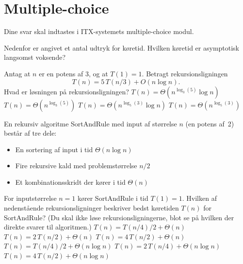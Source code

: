 \section*{Multiple-choice}\label{sec:mc}

Dine svar skal indtastes i ITX-systemets multiple-choice modul.

\multiplechoicestart


Nedenfor er angivet et antal udtryk for køretid. Hvilken køretid er asymptotisk langsomst voksende?
\etsvar
\mulighederstart
{}
\korrekt
\mulighederslut
{}


Antag at $n$ er en potens af $3$, og at $T(1)=1$. Betragt rekursionsligningen
\[
T(n) = 5\, T(n/3) + O(n \log n).
\]
Hvad er løsningen på rekursionsligningen?
\etsvar
\mulighederstart
\svar $T(n) = \Theta(n^{\log_3(5)} \log n)$
\svar $T(n) = \Theta(n^{\log_3(5)})$\korrekt
\svar $T(n) = \Theta(n^{\log_5(3)} \log n)$
\svar $T(n) = \Theta(n^{\log_5(3)})$
\mulighederslut
{}



En rekursiv algoritme {\sc SortAndRule} med input af størrelse $n$ (en potens af~2) består af tre dele:
\begin{itemize}
    \item En sortering af input i tid $\Theta(n \log n)$
    \item Fire rekursive kald med problemstørrelse $n/2$
    \item Et kombinationsskridt der kører i tid $\Theta(n)$
\end{itemize}
For inputstørrelse $n=1$ kører {\sc SortAndRule} i tid $T(1)=1$.
Hvilken af nedenstående rekursionsligninger beskriver bedst køretiden $T(n)$ for {\sc SortAndRule}?
(Du skal ikke løse rekursionsligningerne, blot se på hvilken der direkte svarer til algoritmen.)
\etsvar
\mulighederstart
\svar $T(n) = T(n/4)/2 + \Theta(n)$
\svar $T(n) = 2\, T(n/2) + \Theta(n)$
\svar $T(n) = 4\, T(n/2) + \Theta(n)$
\svar $T(n) = T(n/4)/2 + \Theta(n \log n)$
\svar $T(n) = 2\, T(n/4) + \Theta(n \log n)$
\svar $T(n) = 4\, T(n/2) + \Theta(n \log n)$\korrekt
\mulighederslut
{}


